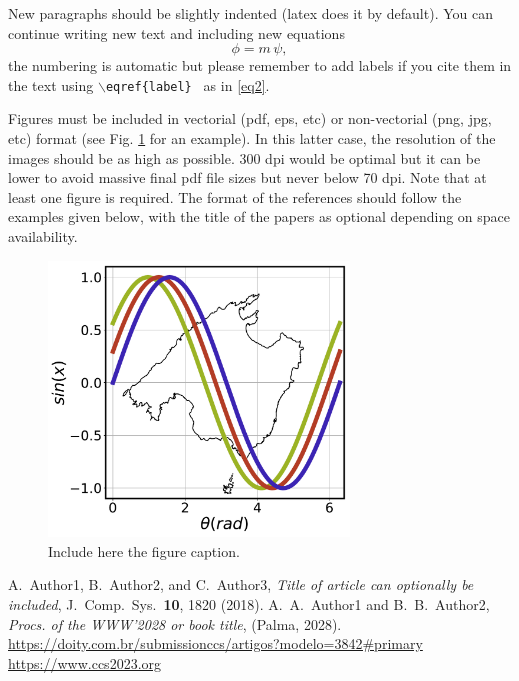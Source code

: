 \documentclass[a4paper]{article}
\begin{document}
New paragraphs should be slightly indented (latex does it by default). You can continue writing new text and including new equations
\begin{equation}
\label{eq2}
\phi = m\, \psi,
\end{equation}
the numbering is automatic but please remember to add labels if you cite them in the text using {\tt $\backslash$eqref\{label\} } as in \eqref{eq2}.

Figures must be included in vectorial (pdf, eps, etc) or non-vectorial (png, jpg, etc) format (see Fig. \ref{fig1} for an example). In this latter case, the resolution of the images should be as high as possible. 300 dpi would be optimal but it can be lower to avoid massive final pdf file sizes but never below 70 dpi. Note that at least one figure is required. The format of the references should follow the examples given below, with the title of the papers as optional depending on space availability.  


\begin{figure}[H]
\begin{center}
\includegraphics[width=8cm]{figure1}
\caption{Include here the figure caption.}
\label{fig1}
\end{center}
\end{figure}

\footnotesize
\begin{thebibliography}{9}
 A.~Author1, B.~Author2, and C.~Author3, \emph{Title of article can optionally be included}, J.\ Comp.\ Sys.\ \textbf{10}, 1820 (2018).
 A.~A.~Author1 and B.~B.~Author2, \emph{Procs. of the WWW'2028 or book title}, (Palma, 2028).
 {\color{blue} \underline{https://doity.com.br/submissionccs/artigos?modelo=3842#primary} }
  {\color{blue} \underline{https://www.ccs2023.org} }
\end{thebibliography}
\end{document}
